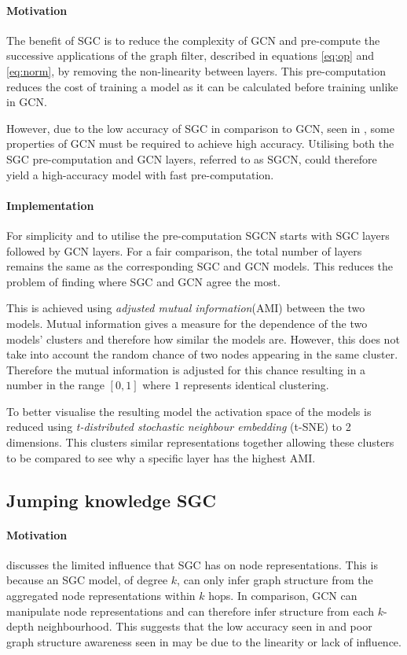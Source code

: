 \paragraph{Motivation}
The benefit of SGC is to reduce the complexity of GCN and pre-compute the successive applications of the graph filter, described in equations \ref{eq:op} and \ref{eq:norm}, by removing the non-linearity between layers.
This pre-computation reduces the cost of training a model as it can be calculated before training unlike in GCN.

However, due to the low accuracy of SGC in comparison to GCN, seen in , some properties of GCN must be required to achieve high accuracy.
Utilising both the SGC pre-computation and GCN layers, referred to as SGCN, could therefore yield a high-accuracy model with fast pre-computation.

\paragraph{Implementation}
For simplicity and to utilise the pre-computation SGCN starts with SGC layers followed by GCN layers.
For a fair comparison, the total number of layers remains the same as the corresponding SGC and GCN models.
This reduces the problem of finding where SGC and GCN agree the most.

This is achieved using \emph{adjusted mutual information}(AMI) between the two models.
Mutual information gives a measure for the dependence of the two models' clusters and therefore how similar the models are.
However, this does not take into account the random chance of two nodes appearing in the same cluster.
Therefore the mutual information is adjusted for this chance resulting in a number in the range $[0, 1]$ where $1$ represents identical clustering.

To better visualise the resulting model the activation space of the models is reduced using \emph{t-distributed stochastic neighbour embedding} (t-SNE) to 2 dimensions.
This clusters similar representations together allowing these clusters to be compared to see why a specific layer has the highest AMI.

\subsection{Jumping knowledge SGC}
\paragraph{Motivation}
 discusses the limited influence that SGC has on node representations.
This is because an SGC model, of degree $k$, can only infer graph structure from the aggregated node representations within $k$ hops.
In comparison, GCN can manipulate node representations and can therefore infer structure from each $k$-depth neighbourhood.
This suggests that the low accuracy seen in  and poor graph structure awareness seen in  may be due to the linearity or lack of influence.

